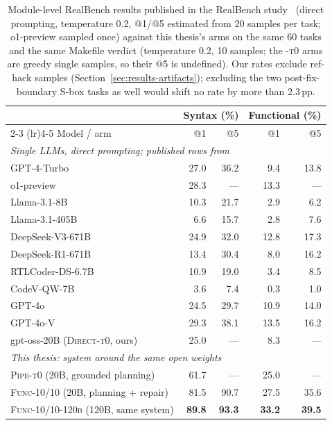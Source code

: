 \begin{table}[htbp]
  \centering
  \caption[Published RealBench results vs.\ this thesis]{Module-level
    RealBench results published in the RealBench
    study~\citep{realbench2025} (direct prompting, temperature 0.2,
    @1/@5 estimated from 20 samples per task; o1-preview sampled once)
    against this thesis's arms on the same 60 tasks and the same
    Makefile verdict (temperature 0.2, 10 samples; the \textsc{-t0}
    arms are greedy single samples, so their @5 is undefined). Our
    rates exclude ref-hack samples
    (Section~\ref{sec:results-artifacts}); excluding the two
    post-fix-boundary S-box tasks as well would shift no rate by more
    than 2.3\,pp.}
  \label{tab:published}
  \small
  \begin{tabular}{lrrrr}
    \toprule
    & \multicolumn{2}{c}{Syntax (\%)} & \multicolumn{2}{c}{Functional (\%)} \\
    \cmidrule(lr){2-3} \cmidrule(lr){4-5}
    Model / arm & @1 & @5 & @1 & @5 \\
    \midrule
    \multicolumn{5}{l}{\emph{Single LLMs, direct prompting; published rows from~\citep{realbench2025}}} \\
    GPT-4-Turbo        & 27.0 & 36.2 &  9.4 & 13.8 \\
    o1-preview         & 28.3 & ---  & 13.3 & ---  \\
    Llama-3.1-8B       & 10.3 & 21.7 &  2.9 &  6.2 \\
    Llama-3.1-405B     &  6.6 & 15.7 &  2.8 &  7.6 \\
    DeepSeek-V3-671B   & 24.9 & 32.0 & 12.8 & 17.3 \\
    DeepSeek-R1-671B   & 13.4 & 30.4 &  8.0 & 16.2 \\
    RTLCoder-DS-6.7B   & 10.9 & 19.0 &  3.4 &  8.5 \\
    CodeV-QW-7B        &  3.6 &  7.4 &  0.3 &  1.0 \\
    GPT-4o             & 24.5 & 29.7 & 10.9 & 14.0 \\
    GPT-4o-V           & 29.3 & 38.1 & 13.5 & 16.2 \\
    gpt-oss-20B (\textsc{Direct-t0}, ours)        & 25.0 & ---  &  8.3 & ---  \\
    \midrule
    \multicolumn{5}{l}{\emph{This thesis: system around the same open weights}} \\
    \textsc{Pipe-t0} (20B, grounded planning)     & 61.7 & ---  & 25.0 & ---  \\
    \textsc{Func-10/10} (20B, planning + repair)  & 81.5 & 90.7 & 27.5 & 35.6 \\
    \textsc{Func-10/10-120b} (120B, same system)  & \textbf{89.8} & \textbf{93.3} & \textbf{33.2} & \textbf{39.5} \\
    \bottomrule
  \end{tabular}
\end{table}

